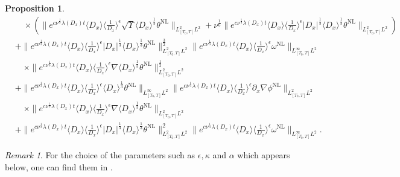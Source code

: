 \documentclass[reqno, 12pt]{amsart} %
\theoremstyle{plain} %
\newtheorem{Prop}[Thm]{Proposition}
\theoremstyle{definition}
\theoremstyle{remark}
\newtheorem{Rem}[Thm]{Remark}
\numberwithin{equation}{section} %
\newcommand{\px}{\partial_x}
\begin{document}
\begin{Prop}
{\begin{align*}
				&\quad  \times(\|e^{c \nu^{\frac{1}{3}} \lambda\left(D_x\right) t}\langle D_x\rangle\langle\frac{1}{D_x}\rangle^\epsilon \sqrt{\Upsilon} \langle D_x \rangle^\frac13  \theta^{\mathrm{NL}}\|_{L_{[T_0, T]}^2 L^2}+\nu^{\frac{1}{6}}\|e^{c \nu^{\frac{1}{3}} \lambda\left(D_x\right) t}\langle D_x\rangle\langle\frac{1}{D_x}\rangle^\epsilon |D_x|^\frac13 \langle D_x \rangle^{\frac{1}{3}} \theta^{\mathrm{NL}}\|_{L_{[T_0, T]}^2 L^2}) \\
				&+\|e^{c \nu^{\frac{1}{3}} \lambda\left(D_x\right) t}\langle D_x\rangle    \langle \frac{1}{D_x}\rangle^\epsilon  \left|D_x\right|^{\frac{1}{3}}\langle D_x \rangle^\frac13 \theta^{\mathrm{NL}}\|_{L_{[T_0, T]}^2 L^2}^\frac32 \|e^{c \nu^{\frac{1}{3}} \lambda\left(D_x\right) t}\langle D_x\rangle\langle\frac{1}{D_x}\rangle^\epsilon \omega^{\mathrm{NL}}\|_{L_{[T_0, T]}^\infty L^2} \\
				& \quad \times\|e^{c \nu^{\frac{1}{3}} \lambda\left(D_x\right) t}\langle D_x\rangle\langle\frac{1}{D_x}\rangle^\epsilon \nabla  \langle D_x \rangle^{\frac{1}{3}} \theta^{\mathrm{NL}}\|_{L_{[T_0, T]}^2 L^2}^\frac12 \\
				&+ \|e^{c \nu^{\frac{1}{3}} \lambda\left(D_x\right) t}\langle D_x\rangle    \langle \frac{1}{D_x}\rangle^\epsilon  \langle D_x \rangle^{\frac{1}{3}} \theta^{\mathrm{NL}}\|_{L_{[T_0, T]}^\infty L^2} \|e^{c \nu^{\frac{1}{3}} \lambda\left(D_x\right) t}\langle D_x\rangle\langle\frac{1}{D_x}\rangle^\epsilon \px \nabla \phi^{\mathrm{NL}}\|_{L_{[T_0, T]}^2 L^2} \\
				& \quad \times\|e^{c \nu^{\frac{1}{3}} \lambda\left(D_x\right) t}\langle D_x\rangle\langle\frac{1}{D_x}\rangle^\epsilon \nabla \langle D_x \rangle^{\frac{1}{3}} \theta^{\mathrm{NL}}\|_{L_{[T_0, T]}^2 L^2} \\
				&+\|e^{c \nu^{\frac{1}{3}} \lambda\left(D_x\right) t}\langle D_x\rangle    \langle \frac{1}{D_x}\rangle^\epsilon  \left|D_x\right|^{\frac{1}{3}} \langle D_x \rangle^{\frac{1}{3}} \theta^{\mathrm{NL}}\|_{L_{[T_0, T]}^2 L^2}^2 \|e^{c \nu^{\frac{1}{3}} \lambda\left(D_x\right) t}\langle D_x\rangle\langle\frac{1}{D_x}\rangle^\epsilon \omega^{\mathrm{NL}}\|_{L_{[T_0, T]}^\infty L^2}  
				.
		\end{align*} }
	\end{Prop}
	
	\begin{Rem}
For the choice of the parameters such as $\epsilon, \kappa$ and $\alpha$ which appears below, one can find them in \cite{LLZ2025}.
	\end{Rem}
	
\end{document}
